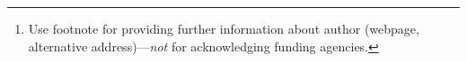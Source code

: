 \documentclass{article}
\begin{document}
\author{%
  David S.~Hippocampus\thanks{Use footnote for providing further information
    about author (webpage, alternative address)---\emph{not} for acknowledging
    funding agencies.} \\
  Department of Computer Science\\
  Cranberry-Lemon University\\
  Pittsburgh, PA 15213 \\
  \texttt{hippo@cs.cranberry-lemon.edu} \\
}
\end{document}
